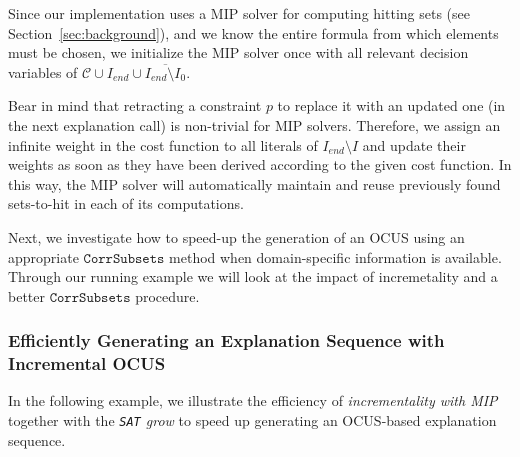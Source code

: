\documentclass[twoside,11pt]{article}
\newcommand\m[1]{\mathcal{#1}}
\newcommand\Iend{\ensuremath{I_\mathit{end} }\xspace}
\newcommand\mm[1]{\ensuremath{#1}\xspace}
\newcommand\call[1]{\mm{\texttt{#1}}}
\newcommand\sat{\texttt{{SAT}}\xspace}
\newcommand\corrsubsets{\mm{\call{CorrSubsets}}}
\begin{document}
Since our implementation uses a MIP solver for computing hitting sets (see Section~\ref{sec:background}), and we know the entire formula from which elements must be chosen,%
we initialize the MIP solver once with all relevant decision variables of $\m{C}\cup \Iend \cup \overline{\Iend \setminus I_0}$. 

Bear in mind that retracting a constraint $p$ to replace it with an updated one (in the next explanation call) is non-trivial for MIP solvers. 
Therefore, we assign an infinite weight in the cost function to all literals of $\Iend\setminus I$ and update their weights as soon as they have been derived according to the given cost function.
In this way, the MIP solver will automatically maintain and reuse previously found sets-to-hit in each of its computations. 

Next, we investigate how to speed-up the generation of an OCUS using an appropriate \corrsubsets method when domain-specific information is available. Through our running example we will look at the impact of incremetality and a better \corrsubsets procedure.


\subsubsection{Efficiently Generating an Explanation Sequence with Incremental OCUS} \label{sec:ocus-incr}
In the following example, we illustrate the efficiency of \textit{incrementality with MIP} together with the \emph{\sat grow} to speed up generating an OCUS-based explanation sequence.
\end{document}

